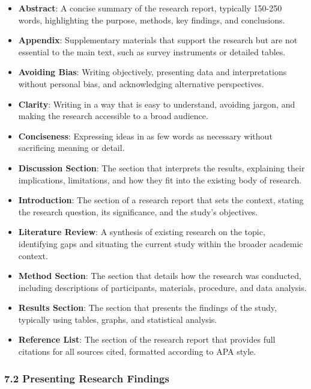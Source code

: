 \documentclass[
]{book}
\providecommand{\tightlist}{%
  \setlength{\itemsep}{0pt}\setlength{\parskip}{0pt}}
\begin{document}
\begin{itemize}
\tightlist
\item
  \textbf{Abstract}: A concise summary of the research report, typically 150-250 words, highlighting the purpose, methods, key findings, and conclusions.
\item
  \textbf{Appendix}: Supplementary materials that support the research but are not essential to the main text, such as survey instruments or detailed tables.
\item
  \textbf{Avoiding Bias}: Writing objectively, presenting data and interpretations without personal bias, and acknowledging alternative perspectives.
\item
  \textbf{Clarity}: Writing in a way that is easy to understand, avoiding jargon, and making the research accessible to a broad audience.
\item
  \textbf{Conciseness}: Expressing ideas in as few words as necessary without sacrificing meaning or detail.
\item
  \textbf{Discussion Section}: The section that interprets the results, explaining their implications, limitations, and how they fit into the existing body of research.
\item
  \textbf{Introduction}: The section of a research report that sets the context, stating the research question, its significance, and the study's objectives.
\item
  \textbf{Literature Review}: A synthesis of existing research on the topic, identifying gaps and situating the current study within the broader academic context.
\item
  \textbf{Method Section}: The section that details how the research was conducted, including descriptions of participants, materials, procedure, and data analysis.
\item
  \textbf{Results Section}: The section that presents the findings of the study, typically using tables, graphs, and statistical analysis.
\item
  \textbf{Reference List}: The section of the research report that provides full citations for all sources cited, formatted according to APA style.
\end{itemize}

\subsubsection*{\texorpdfstring{\textbf{7.2 Presenting Research Findings}}{7.2 Presenting Research Findings}}\label{presenting-research-findings-1}
\end{document}
